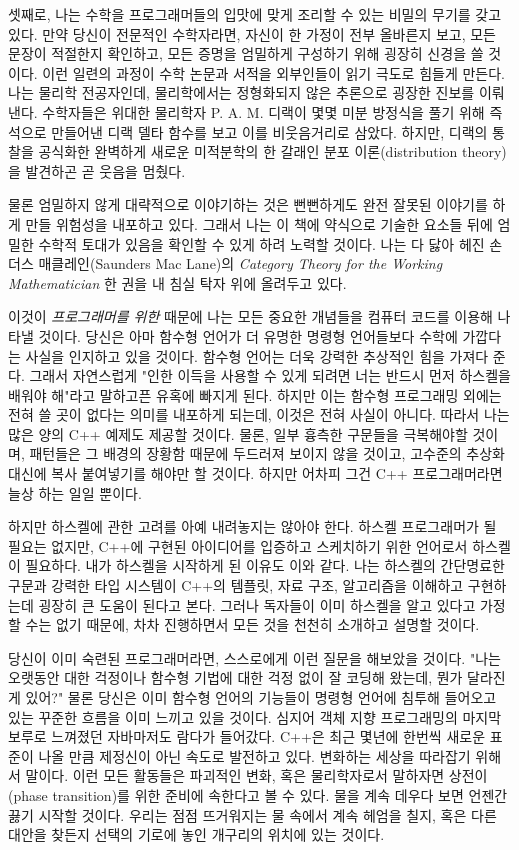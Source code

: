 셋째로, 나는 수학을 프로그래머들의 입맛에 맞게 조리할 수 있는 비밀의 무기를 갖고 있다.
만약 당신이 전문적인 수학자라면, 자신이 한 가정이 전부 올바른지 보고, 모든 문장이 적절한지 확인하고, 모든 증명을 엄밀하게 구성하기 위해 굉장히 신경을 쓸 것이다.
이런 일련의 과정이 수학 논문과 서적을 외부인들이 읽기 극도로 힘들게 만든다. 나는 물리학 전공자인데, 물리학에서는 정형화되지 않은 추론으로 굉장한 진보를 이뤄낸다.
수학자들은 위대한 물리학자 P. A. M. 디랙이 몇몇 미분 방정식을 풀기 위해 즉석으로 만들어낸 디랙 델타 함수를 보고 이를 비웃음거리로 삼았다.
하지만, 디랙의 통찰을 공식화한 완벽하게 새로운 미적분학의 한 갈래인 분포 이론(distribution theory)을 발견하곤 곧 웃음을 멈췄다.

물론 엄밀하지 않게 대략적으로 이야기하는 것은 뻔뻔하게도 완전 잘못된 이야기를 하게 만들 위험성을 내포하고 있다.
그래서 나는 이 책에 약식으로 기술한 요소들 뒤에 엄밀한 수학적 토대가 있음을 확인할 수 있게 하려 노력할 것이다.
나는 다 닳아 헤진 손더스 매클레인(Saunders Mac Lane)의 \emph{Category Theory for the Working Mathematician} 한 권을 내 침실 탁자 위에 올려두고 있다.

이것이 \emph{프로그래머를 위한}  때문에 나는 모든 중요한 개념들을 컴퓨터 코드를 이용해 나타낼 것이다.
당신은 아마 함수형 언어가 더 유명한 명령형 언어들보다 수학에 가깝다는 사실을 인지하고 있을 것이다. 함수형 언어는 더욱 강력한 추상적인 힘을 가져다 준다.
그래서 자연스럽게 "\trCategoryTheory\로 인한 이득을 사용할 수 있게 되려면 너는 반드시 먼저 하스켈을 배워야 해"라고 말하고픈 유혹에 빠지게 된다.
하지만 이는 \trCategoryTheory\가 함수형 프로그래밍 외에는 전혀 쓸 곳이 없다는 의미를 내포하게 되는데, 이것은 전혀 사실이 아니다. 따라서 나는 많은 양의 C++ 예제도 제공할 것이다.
물론, 일부 흉측한 구문들을 극복해야할 것이며, 패턴들은 그 배경의 장황함 때문에 두드러져 보이지 않을 것이고, 고수준의 추상화 대신에 복사 붙여넣기를 해야만 할 것이다.
하지만 어차피 그건 C++ 프로그래머라면 늘상 하는 일일 뿐이다.

하지만 하스켈에 관한 고려를 아예 내려놓지는 않아야 한다. 하스켈 프로그래머가 될 필요는 없지만, C++에 구현된 아이디어를 입증하고 스케치하기 위한 언어로서 하스켈이 필요하다.
내가 하스켈을 시작하게 된 이유도 이와 같다. 나는 하스켈의 간단명료한 구문과 강력한 타입 시스템이 C++의 템플릿, 자료 구조, 알고리즘을 이해하고 구현하는데 굉장히 큰 도움이 된다고 본다.
그러나 독자들이 이미 하스켈을 알고 있다고 가정할 수는 없기 때문에, 차차 진행하면서 모든 것을 천천히 소개하고 설명할 것이다.

당신이 이미 숙련된 프로그래머라면, 스스로에게 이런 질문을 해보았을 것이다. 
"나는 오랫동안  대한 걱정이나 함수형 기법에 대한 걱정 없이 잘 코딩해 왔는데, 뭔가 달라진 게 있어?"
물론 당신은 이미 함수형 언어의 기능들이 명령형 언어에 침투해 들어오고 있는 꾸준한 흐름을 이미 느끼고 있을 것이다.
심지어 객체 지향 프로그래밍의 마지막 보루로 느껴졌던 자바마저도 람다가 들어갔다.
C++은 최근 몇년에 한번씩 새로운 표준이 나올 만큼 제정신이 아닌 속도로 발전하고 있다. 변화하는 세상을 따라잡기 위해서 말이다.
이런 모든 활동들은 파괴적인 변화, 혹은 물리학자로서 말하자면 상전이(phase transition)를 위한 준비에 속한다고 볼 수 있다.
물을 계속 데우다 보면 언젠간 끓기 시작할 것이다. 우리는 점점 뜨거워지는 물 속에서 계속 헤엄을 칠지, 혹은 다른 대안을 찾든지 선택의 기로에 놓인 개구리의 위치에 있는 것이다.

